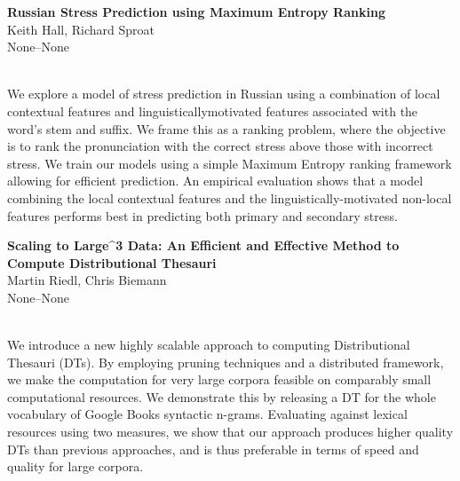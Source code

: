 \documentclass[twoside,makeidx]{book}
\begin{document}
\par\vspace{2em}\noindent%
\begin{minipage}{\linewidth}%
\begin{center}
\textbf{\normalsize Russian Stress Prediction using Maximum Entropy Ranking}\\
\normalsize  Keith Hall,  Richard Sproat\\
{\small None--None}\\
\end{center}
\end{minipage}\\[0.5em]
\nopagebreak%
\noindent%
{\small We explore a model of stress prediction in Russian using a combination of local contextual features and linguisticallymotivated features associated with the word's stem and suffix. We frame this as a ranking problem, where the objective is to rank the pronunciation with the correct stress above those with incorrect stress. We train our models using a simple Maximum Entropy ranking framework allowing for efficient prediction. An empirical evaluation shows that a model combining the local contextual features and the linguistically-motivated non-local features performs best in predicting both primary and secondary stress.}
\par\vspace{2em}\noindent%
\begin{minipage}{\linewidth}%
\begin{center}
\textbf{\normalsize Scaling to Large\^{}3 Data: An Efficient and Effective Method to Compute Distributional Thesauri}\\
\normalsize  Martin Riedl,  Chris Biemann\\
{\small None--None}\\
\end{center}
\end{minipage}\\[0.5em]
\nopagebreak%
\noindent%
{\small We introduce a new highly scalable approach to computing Distributional Thesauri (DTs). By employing pruning techniques and a distributed framework, we make the computation for very large corpora feasible on comparably small computational resources. We demonstrate this by releasing a DT for the whole vocabulary of Google Books syntactic n-grams. Evaluating against lexical resources using two measures, we show that our approach produces higher quality DTs than previous approaches, and is thus preferable in terms of speed and quality for large corpora.}
\end{document}

